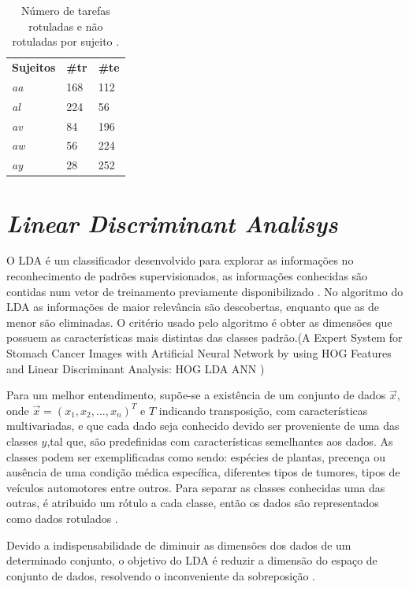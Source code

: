 \begin{table}[h!]
	\centering
	\caption{Número de tarefas rotuladas e não rotuladas por sujeito \cite{BCICompetition}.}
	\label{my-label}
	\begin{tabular}{lll}
		\textbf{Sujeitos} & \textbf{\#tr} & \textbf{\#te} \\
		\textit{aa} & 168 & 112 \\
		\textit{al} & 224 & 56 \\
		\textit{av} & 84 & 196 \\
		\textit{aw} & 56 & 224 \\
		\textit{ay} & 28 & 252
	\end{tabular}
\end{table}
 
\section{\textit{Linear Discriminant Analisys}}
O LDA é um classificador desenvolvido para explorar as informações no reconhecimento de padrões supervisionados,
as informações conhecidas são contidas num vetor de treinamento previamente disponibilizado \cite{izenmanLDA}.
No algoritmo do LDA as informações de maior relevância são descobertas, enquanto que as de menor são 
eliminadas. O critério usado pelo algoritmo é obter as dimensões que possuem as características mais
distintas das classes padrão.(A Expert System for Stomach Cancer Images with
Artificial Neural Network by using HOG Features
and Linear Discriminant Analysis:
HOG LDA ANN )

Para um melhor entendimento, supõe-se a existência de um conjunto de dados $\vec x$, onde $\vec x = (x_1, x_2,...,x_n)^T$
e $T$ indicando transposição, com características multivariadas, e que cada dado
seja conhecido devido ser proveniente de uma das  classes $y$,tal que, são predefinidas com características
semelhantes aos dados. As classes podem ser exemplificadas como sendo: espécies de plantas,
precença ou ausência de uma condição médica específica, diferentes tipos de tumores, tipos de veículos automotores
entre outros. Para separar as classes conhecidas uma das outras, é atribuido um rótulo a cada classe, então os dados são
representados como dados rotulados \cite{izenmanLDA}.


Devido a indispensabilidade de diminuir as dimensões dos dados de um determinado conjunto, o objetivo do LDA
é reduzir a dimensão do espaço de conjunto de dados, resolvendo o inconveniente da sobreposição \cite{SinghLDA}.

